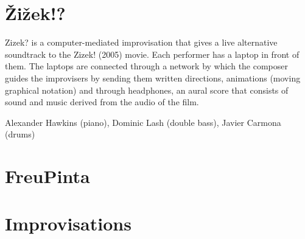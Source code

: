 \section{\v{Z}i\v{z}ek!?}

Zizek? is a computer-mediated improvisation that gives a live alternative soundtrack to the Zizek! (2005) movie. Each performer has a laptop in front of them. The laptops are connected through a network by which the composer guides the improvisers by sending them written directions, animations (moving graphical notation) and through headphones, an aural score that consists of sound and music derived from the audio of the film. 

Alexander Hawkins (piano), Dominic Lash (double bass), Javier Carmona (drums)

\section{FreuPinta}


\section{Improvisations}


\label{ch:compositions}